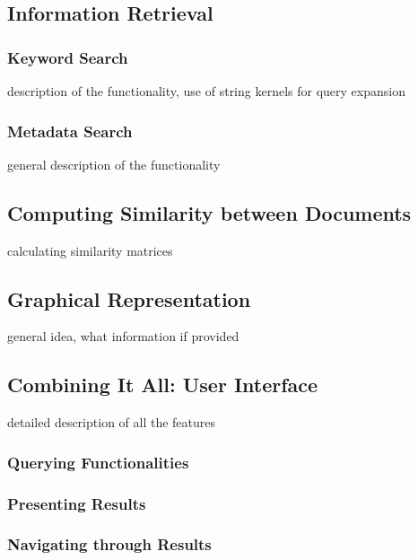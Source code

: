 \subsection {Information Retrieval}
	\subsubsection{Keyword Search}
	\note description of the functionality, use of string kernels for query expansion 
	\subsubsection{Metadata Search}
	\note general description of the functionality
	
\subsection {Computing Similarity between Documents}
\note calculating similarity matrices

\subsection {Graphical Representation}
\note general idea, what information if provided	

\subsection {Combining It All: User Interface}
\note detailed description of all the features 
	\subsubsection {Querying Functionalities}
	\subsubsection {Presenting Results}
	\subsubsection {Navigating through Results}

